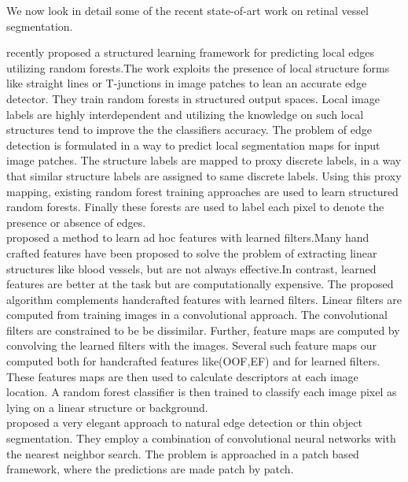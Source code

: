 We now look in detail some of the recent state-of-art work on retinal vessel segmentation.

\citet{dollar2013structured} recently proposed a structured learning framework for predicting local edges utilizing random forests.The work exploits the presence of local structure forms like straight lines or T-junctions in image patches to lean an accurate edge detector. They train random forests in structured output spaces. Local image labels are highly interdependent and utilizing the knowledge on such local structures tend to improve the the classifiers accuracy. The problem of edge detection is formulated in a way to predict local segmentation maps for input image patches.  The structure labels are mapped to proxy discrete labels, in a way that similar structure labels are assigned to same discrete labels. Using this proxy mapping, existing random forest training approaches are used to learn structured random forests. Finally these forests are used to label each pixel to denote the presence or absence of edges.\\

\citet{rigamonti2012accurate} proposed a method to learn ad hoc features with learned filters.Many hand crafted features have been proposed to solve the problem of extracting linear structures like blood vessels, but are not always effective.In contrast, learned features are better at the task but are computationally expensive. The proposed algorithm complements handcrafted features with learned filters. Linear filters are computed from training images in a convolutional approach. The convolutional filters are constrained to be be dissimilar. Further, feature maps are computed by convolving the learned filters with the images. Several such feature maps our computed both for handcrafted features like(OOF,EF) and for learned filters. These features maps are then used to calculate descriptors at each image location. A random forest classifier is then trained to classify each image pixel as lying on a linear structure or background.\\

\citet{ganin2014n} proposed a very elegant approach to natural edge detection or thin object segmentation. They employ a combination of convolutional neural networks with the nearest neighbor search. The problem is approached in a patch based framework, where the predictions are made patch by patch.